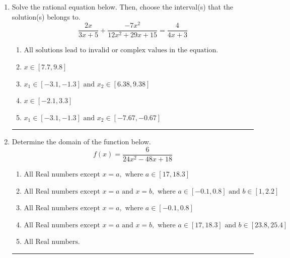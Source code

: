 \documentclass[14pt]{extbook}
\newcommand{\litem}[1]{\item#1\hspace*{-1cm}\rule{\textwidth}{0.4pt}}
\begin{document}
\begin{enumerate}
{\begin{enumerate}[label=\Alph*.]
\end{enumerate} }
\litem{
Solve the rational equation below. Then, choose the interval(s) that the solution(s) belongs to.\[ \frac{2x}{3x + 5} + \frac{-7x^{2}}{12x^{2} +29 x + 15} = \frac{4}{4x + 3} \]\begin{enumerate}[label=\Alph*.]
\item \( \text{All solutions lead to invalid or complex values in the equation.} \)
\item \( x \in [7.7,9.8] \)
\item \( x_1 \in [-3.1, -1.3] \text{ and } x_2 \in [6.38,9.38] \)
\item \( x \in [-2.1,3.3] \)
\item \( x_1 \in [-3.1, -1.3] \text{ and } x_2 \in [-7.67,-0.67] \)

\end{enumerate} }
\litem{
Determine the domain of the function below.\[ f(x) = \frac{6}{24x^{2} -48 x + 18} \]\begin{enumerate}[label=\Alph*.]
\item \( \text{All Real numbers except } x = a, \text{ where } a \in [17, 18.3] \)
\item \( \text{All Real numbers except } x = a \text{ and } x = b, \text{ where } a \in [-0.1, 0.8] \text{ and } b \in [1, 2.2] \)
\item \( \text{All Real numbers except } x = a, \text{ where } a \in [-0.1, 0.8] \)
\item \( \text{All Real numbers except } x = a \text{ and } x = b, \text{ where } a \in [17, 18.3] \text{ and } b \in [23.8, 25.4] \)
\item \( \text{All Real numbers.} \)

\end{enumerate} }
\end{enumerate}
\end{document}
